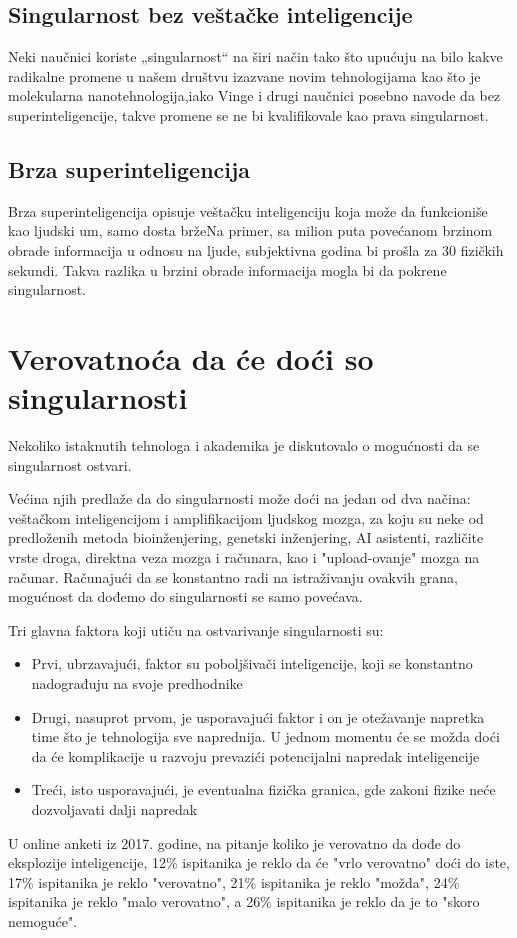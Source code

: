 \documentclass[a4paper]{article}
\begin{document}
\subsection{Singularnost bez veštačke inteligencije}

Neki naučnici koriste „singularnost“ na širi način tako što upućuju na bilo kakve radikalne promene u našem društvu izazvane novim tehnologijama kao što je molekularna nanotehnologija,\cite{ref 9}\cite{ref 10}\cite{ref 11}iako Vinge i drugi naučnici posebno navode da bez superinteligencije, takve promene se ne bi kvalifikovale kao prava singularnost.

\subsection{Brza superinteligencija}
Brza superinteligencija opisuje veštačku inteligenciju koja može da funkcioniše kao ljudski um, samo dosta brže\cite{ref 12}Na primer, sa milion puta povećanom brzinom obrade informacija u odnosu na ljude, subjektivna godina bi prošla za 30 fizičkih sekundi. Takva razlika u brzini obrade informacija mogla bi da pokrene singularnost.

\section{Verovatnoća da će doći so singularnosti}	
\label{sec:verovatnoća}
Nekoliko istaknutih tehnologa i akademika je diskutovalo o mogućnosti da se singularnost ostvari. 

Većina njih predlaže da do singularnosti može doći na jedan od dva načina: veštačkom inteligencijom i amplifikacijom ljudskog mozga, za koju su neke od predloženih metoda bioinženjering, genetski inženjering, AI asistenti, različite vrste droga, direktna veza mozga i računara, kao i "upload-ovanje" mozga na računar. Računajući da se konstantno radi na istraživanju ovakvih grana, mogućnost da dođemo do singularnosti se samo povećava. \cite{mog-1}

Tri glavna faktora koji utiču na ostvarivanje singularnosti su: \cite{mog-2}
\begin{itemize}
\item Prvi, ubrzavajući, faktor su poboljšivači inteligencije, koji se konstantno nadograđuju na svoje predhodnike 
\item Drugi, nasuprot prvom, je usporavajući faktor i on je otežavanje napretka time što je tehnologija sve naprednija. U jednom momentu će se možda doći da će komplikacije u razvoju prevazići potencijalni napredak inteligencije
\item Treći, isto usporavajući, je eventualna fizička granica, gde zakoni fizike neće dozvoljavati dalji napredak  
\end{itemize} 
U online anketi iz 2017. godine, na pitanje koliko je verovatno da dođe do eksplozije inteligencije, 12\% ispitanika je reklo da će "vrlo verovatno" doći do iste, 17\% ispitanika je reklo "verovatno", 21\% ispitanika je reklo "možda", 24\% ispitanika je reklo "malo verovatno", a 26\% ispitanika je reklo da je to "skoro nemoguće". \cite{mog-3}
\end{document}
